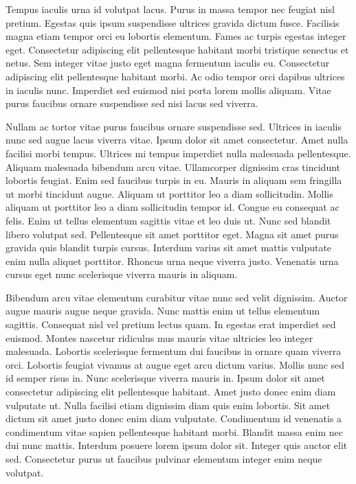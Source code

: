 \documentclass[epsf,a4paper]{book}
\begin{document}
Tempus iaculis urna id volutpat lacus. Purus in massa tempor nec feugiat nisl pretium. Egestas quis ipsum suspendisse ultrices gravida dictum fusce. Facilisis magna etiam tempor orci eu lobortis elementum. Fames ac turpis egestas integer eget. Consectetur adipiscing elit pellentesque habitant morbi tristique senectus et netus. Sem integer vitae justo eget magna fermentum iaculis eu. Consectetur adipiscing elit pellentesque habitant morbi. Ac odio tempor orci dapibus ultrices in iaculis nunc. Imperdiet sed euismod nisi porta lorem mollis aliquam. Vitae purus faucibus ornare suspendisse sed nisi lacus sed viverra.

Nullam ac tortor vitae purus faucibus ornare suspendisse sed. Ultrices in iaculis nunc sed augue lacus viverra vitae. Ipsum dolor sit amet consectetur. Amet nulla facilisi morbi tempus. Ultrices mi tempus imperdiet nulla malesuada pellentesque. Aliquam malesuada bibendum arcu vitae. Ullamcorper dignissim cras tincidunt lobortis feugiat. Enim sed faucibus turpis in eu. Mauris in aliquam sem fringilla ut morbi tincidunt augue. Aliquam ut porttitor leo a diam sollicitudin. Mollis aliquam ut porttitor leo a diam sollicitudin tempor id. Congue eu consequat ac felis. Enim ut tellus elementum sagittis vitae et leo duis ut. Nunc sed blandit libero volutpat sed. Pellentesque sit amet porttitor eget. Magna sit amet purus gravida quis blandit turpis cursus. Interdum varius sit amet mattis vulputate enim nulla aliquet porttitor. Rhoncus urna neque viverra justo. Venenatis urna cursus eget nunc scelerisque viverra mauris in aliquam.

Bibendum arcu vitae elementum curabitur vitae nunc sed velit dignissim. Auctor augue mauris augue neque gravida. Nunc mattis enim ut tellus elementum sagittis. Consequat nisl vel pretium lectus quam. In egestas erat imperdiet sed euismod. Montes nascetur ridiculus mus mauris vitae ultricies leo integer malesuada. Lobortis scelerisque fermentum dui faucibus in ornare quam viverra orci. Lobortis feugiat vivamus at augue eget arcu dictum varius. Mollis nunc sed id semper risus in. Nunc scelerisque viverra mauris in. Ipsum dolor sit amet consectetur adipiscing elit pellentesque habitant. Amet justo donec enim diam vulputate ut. Nulla facilisi etiam dignissim diam quis enim lobortis. Sit amet dictum sit amet justo donec enim diam vulputate. Condimentum id venenatis a condimentum vitae sapien pellentesque habitant morbi. Blandit massa enim nec dui nunc mattis. Interdum posuere lorem ipsum dolor sit. Integer quis auctor elit sed. Consectetur purus ut faucibus pulvinar elementum integer enim neque volutpat.
\end{document}
